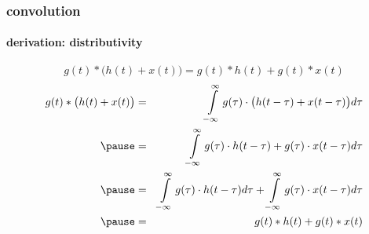 \begin{frame}\frametitle{convolution}\framesubtitle{derivation: distributivity}
\begin{footnotesize}
		\begin{equation*}
			g(t) \ast \big(h(t) + x(t)\big) = g(t) \ast h(t) + g(t) \ast x(t) 
		\end{equation*}
		\begin{eqnarray*}
			g(t) \ast \big(h(t) + x(t)\big) &=& \int\limits_{-\infty}^{\infty}{g(\tau) \cdot\big(h(t-\tau) + x(t-\tau)\big)}d\tau\nonumber\\
									\pause&=& \int\limits_{-\infty}^{\infty}{g(\tau) \cdot h(t-\tau) + g(\tau) \cdot x(t-\tau)}d\tau\nonumber\\
									\pause&=& \int\limits_{-\infty}^{\infty}{g(\tau) \cdot h(t-\tau)}d\tau + \int\limits_{-\infty}^{\infty}{g(\tau) \cdot x(t-\tau)}d\tau\nonumber\\
									\pause&=& g(t) \ast h(t) + g(t) \ast x(t) 
		\end{eqnarray*}
\end{footnotesize}
\end{frame}	

